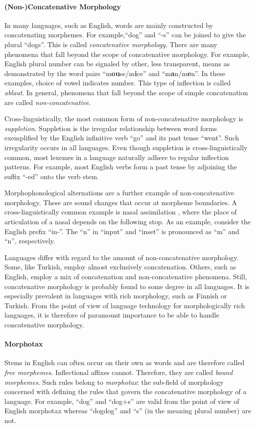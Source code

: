\paragraph{(Non-)Concatenative Morphology} In many languages, such as
English, words are mainly constructed by concatenating morphemes. For
example,``dog'' and ``-s'' can be joined to give the plural
``dogs''. This is called {\it concatenative morphology}. There are
many phenomena that fall beyond the scope of concatenative
morphology. For example, English plural number can be signaled by
other, less transparent, means as demonstrated by the word pairs
``m{\bf ou}se/m{\bf i}ce'' and ``m{\bf a}n/m{\bf e}n''. In these
examples, choice of vowel indicates number. This type of inflection is
called {\it ablaut}. In general, phenomena that fall beyond the scope
of simple concatenation are called {\it non-concatenative}.

Cross-linguistically, the most common form of non-concatenative
morphology is {\it suppletion}. Suppletion is the irregular
relationship between word forms exemplified by the English infinitive
verb ``go'' and its past tense ``went''. Such irregularity occurs in
all languages. Even though suppletion is cross-linguistically common,
most lexemes in a language naturally adhere to regular inflection
patterns. For example, most English verbs form a past tense by
adjoining the suffix ``-ed'' onto the verb stem.

Morphophonological alternations are a further example of
non-concatenative morphology. These are sound changes that occur at
morpheme boundaries. A cross-linguistically common example is nasal
assimilation \citep[p. 29]{Carr1993}, where the place of articulation
of a nasal depends on the following stop. As an example, consider the
English prefix ``in-''. The ``n'' in ``input'' and ``inset'' is
pronounced as ``m'' and ``n'', respectively.

Languages differ with regard to the amount of non-concatenative
morphology. Some, like Turkish, employ almost exclusively
concatenation.  Others, such as English, employ a mix of concatenation
and non-concatenative phenomena. Still, concatenative morphology is
probably found to some degree in all languages. It is especially
prevalent in languages with rich morphology, such as Finnish or
Turkish. From the point of view of language technology for
morphologically rich languages, it is therefore of paramount
importance to be able to handle concatenative morphology.

\paragraph{Morphotax} Stems in English can often occur on their own as
words and are therefore called {\it free morphemes}. Inflectional
affixes cannot. Therefore, they are called {\it bound morphemes}. Such
rules belong to {\it morphotax}: the sub-field of morphology
concerned with defining the rules that govern the concatenative
morphology of a language. For example, ``dog'' and ``dog+s'' are valid
from the point of view of English morphotax whereas ``dogdog'' and
``s'' (in the meaning plural number) are not.


